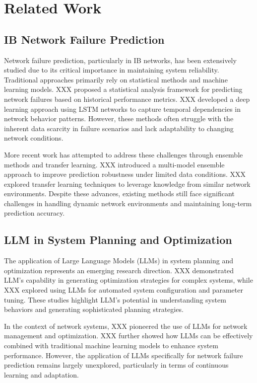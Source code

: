 \documentclass[conference]{IEEEtran}
\begin{document}
\section{Related Work}

\subsection{IB Network Failure Prediction}

Network failure prediction, particularly in IB networks, has been extensively studied due to its critical importance in maintaining system reliability. Traditional approaches primarily rely on statistical methods and machine learning models. XXX proposed a statistical analysis framework for predicting network failures based on historical performance metrics. XXX developed a deep learning approach using LSTM networks to capture temporal dependencies in network behavior patterns. However, these methods often struggle with the inherent data scarcity in failure scenarios and lack adaptability to changing network conditions.
	
More recent work has attempted to address these challenges through ensemble methods and transfer learning. XXX introduced a multi-model ensemble approach to improve prediction robustness under limited data conditions. XXX explored transfer learning techniques to leverage knowledge from similar network environments. Despite these advances, existing methods still face significant challenges in handling dynamic network environments and maintaining long-term prediction accuracy.

\subsection{LLM in System Planning and Optimization}

The application of Large Language Models (LLMs) in system planning and optimization represents an emerging research direction. XXX demonstrated LLM's capability in generating optimization strategies for complex systems, while XXX explored using LLMs for automated system configuration and parameter tuning. These studies highlight LLM's potential in understanding system behaviors and generating sophisticated planning strategies.

In the context of network systems, XXX pioneered the use of LLMs for network management and optimization. XXX further showed how LLMs can be effectively combined with traditional machine learning models to enhance system performance. However, the application of LLMs specifically for network failure prediction remains largely unexplored, particularly in terms of continuous learning and adaptation.
\end{document}
